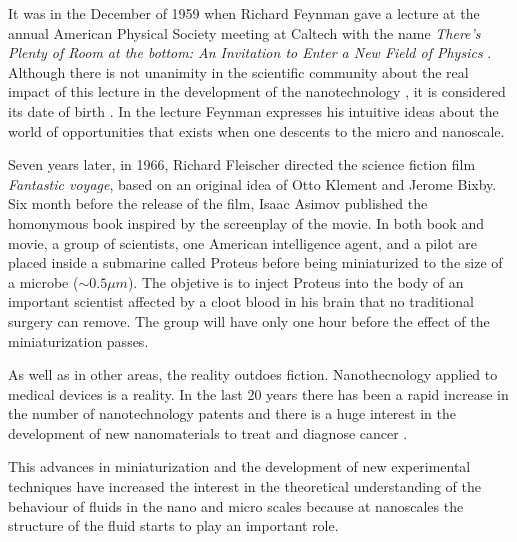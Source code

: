 \documentclass[b5paper,openright,10pt]{book}
\begin{document}
It was in the December of 1959 when Richard Feynman gave a lecture at the annual American Physical Society meeting at Caltech with the name {\it There's Plenty of Room at the bottom: An Invitation to Enter a New Field of Physics} \cite{Feynman1960}. 
Although there is not unanimity in the scientific community about the real impact of this lecture in the development of the nanotechnology \cite{Nature2009}, it is considered its date of birth \cite{Tourney2008}. 
In the lecture Feynman expresses his intuitive ideas about the world of opportunities that exists when one descents to the micro and nanoscale. 

Seven years later, in 1966, Richard Fleischer directed the science fiction film {\it Fantastic voyage}, based on an original idea of Otto Klement and Jerome Bixby. 
Six month before the release of the film, Isaac Asimov published the homonymous book \cite{Asimov1966} inspired by the screenplay of the movie.  
In both book and movie, a group of scientists, one American intelligence agent, and a pilot are placed inside a submarine called Proteus before being miniaturized to the size of a microbe ($\sim 0.5 \mu m$). The objetive is to inject Proteus into the body of an important scientist affected by a cloot blood in his brain that no traditional surgery can remove. The group will have only one hour before the effect of the miniaturization passes.  

As well as in other areas, the reality outdoes fiction. 
Nanothecnology applied to medical devices is a reality. In the last 20 years there has been a rapid increase in the number of nanotechnology patents \cite{Zheng2014} and there is a huge interest in the development of new nanomaterials to treat and diagnose cancer \cite{Nazir2014, Dreaden2012, Kievit2011}. 

This   advances  in   miniaturization  and   the  development   of  new
experimental techniques have  increased the
interest in the  theoretical understanding of the  behaviour of fluids in the nano \cite{Bocquet2010,KarniadakisBook2005} and micro \cite{Lauga2005, Bocquet2011,KarniadakisBook2005} scales because at nanoscales  the structure  of the  fluid starts to play an  important
role.   
\end{document}
